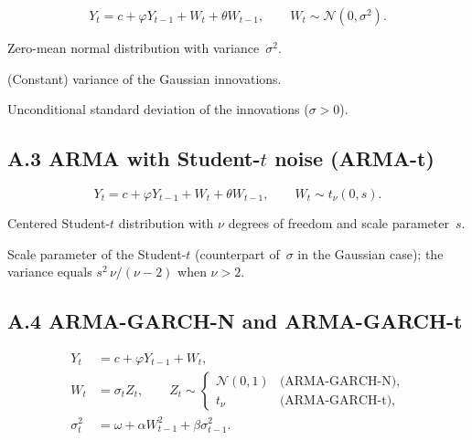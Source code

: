 \begin{equation*}
  Y_t = c + \varphi Y_{t-1} + W_t + \theta W_{t-1},
  \qquad
  W_t \sim \mathcal{N}(0,\sigma^2).
\end{equation*}

\begin{description}[style=nextline,leftmargin=2.2cm,labelwidth=2cm]
  \item[$\mathcal{N}(0,\sigma^2)$]
    Zero-mean normal distribution with variance~$\sigma^2$.
  \item[$\sigma^2$]
    (Constant) variance of the Gaussian innovations.
  \item[$\sigma$]
    Unconditional standard deviation of the innovations ($\sigma > 0$).
\end{description}

\subsection*{A.3 ARMA with Student-$t$ noise (ARMA-t)}

\begin{equation*}
  Y_t = c + \varphi Y_{t-1} + W_t + \theta W_{t-1},
  \qquad
  W_t \sim t_{\nu}(0,s).
\end{equation*}

\begin{description}[style=nextline,leftmargin=2.2cm,labelwidth=2cm]
  \item[$t_{\nu}(0,s)$]
    Centered Student-$t$ distribution with $\nu$ degrees of freedom and scale parameter~$s$.
  \item[$s$]
    Scale parameter of the Student-$t$ (counterpart of~$\sigma$ in the Gaussian case);
    the variance equals $s^2\,\nu/(\nu-2)$ when $\nu > 2$.
\end{description}

\subsection*{A.4 ARMA-GARCH-N and ARMA-GARCH-t}

\begin{align*}
  Y_t &= c + \varphi Y_{t-1} + W_t, \\
  W_t &= \sigma_t Z_t,
  \qquad Z_t \sim
  \begin{cases}
    \mathcal{N}(0,1) & \text{(ARMA-GARCH-N)}, \\
    t_{\nu} & \text{(ARMA-GARCH-t)},
  \end{cases} \\
  \sigma_t^2 &= \omega + \alpha W_{t-1}^2 + \beta \sigma_{t-1}^2.
\end{align*}

